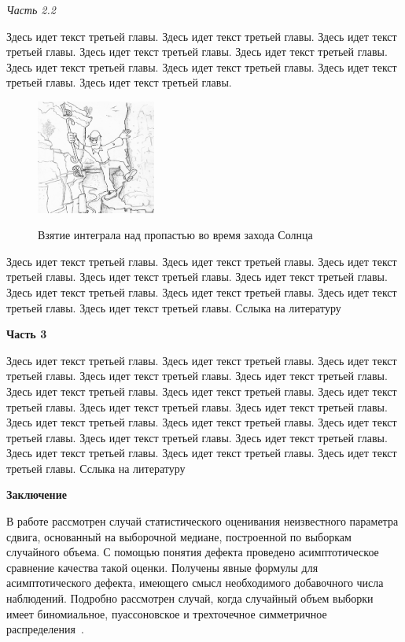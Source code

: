 \documentclass[a4paper,twoside]{article}
\newcommand{\header}[1]{\bigskip\medskip\noindent\textbf{#1}\nopagebreak\bigskip}
\newcommand{\subheader}[1]{\bigskip\medskip\noindent\emph{#1}\nopagebreak\bigskip}
\theoremstyle{theorem}
\theoremstyle{remark}
\begin{document}
\subheader{Часть 2.2}

Здесь идет текст третьей главы. Здесь идет текст третьей главы. Здесь идет текст третьей главы.
Здесь идет текст третьей главы. Здесь идет текст третьей главы. Здесь идет текст третьей главы.
Здесь идет текст третьей главы. Здесь идет текст третьей главы. Здесь идет текст третьей главы.
\begin{figure}[htp]
\centering
\includegraphics[width=0.35\textwidth]{pict.png}
\it
\caption{Взятие интеграла над пропастью во время захода Солнца} \label{f1}
\end{figure}
Здесь идет текст третьей главы. Здесь идет текст третьей главы. Здесь идет текст третьей главы.
Здесь идет текст третьей главы. Здесь идет текст третьей главы. Здесь идет текст третьей главы.
Здесь идет текст третьей главы. Здесь идет текст третьей главы. Здесь идет текст третьей главы.
Сслыка на литературу \cite{Conference}

\header{Часть 3}

Здесь идет текст третьей главы. Здесь идет текст третьей главы. Здесь идет текст третьей главы.
Здесь идет текст третьей главы. Здесь идет текст третьей главы. Здесь идет текст третьей главы.
Здесь идет текст третьей главы. Здесь идет текст третьей главы. Здесь идет текст третьей главы.
Здесь идет текст третьей главы. Здесь идет текст третьей главы. Здесь идет текст третьей главы.
Здесь идет текст третьей главы. Здесь идет текст третьей главы. Здесь идет текст третьей главы.
Здесь идет текст третьей главы. Здесь идет текст третьей главы. Здесь идет текст третьей главы.
Сслыка на литературу \cite{Article}

\header{Заключение}

В работе рассмотрен случай статистического оценивания неизвестного параметра сдвига, основанный на выборочной медиане, построенной по выборкам случайного объема. С помощью понятия дефекта проведено асимптотическое сравнение качества такой оценки. Получены явные формулы для асимптотического дефекта, имеющего смысл необходимого добавочного числа наблюдений. Подробно рассмотрен случай, когда случайный объем выборки имеет биномиальное, пуассоновское и трехточечное симметричное распределения~\cite{webSite}.
\end{document}
